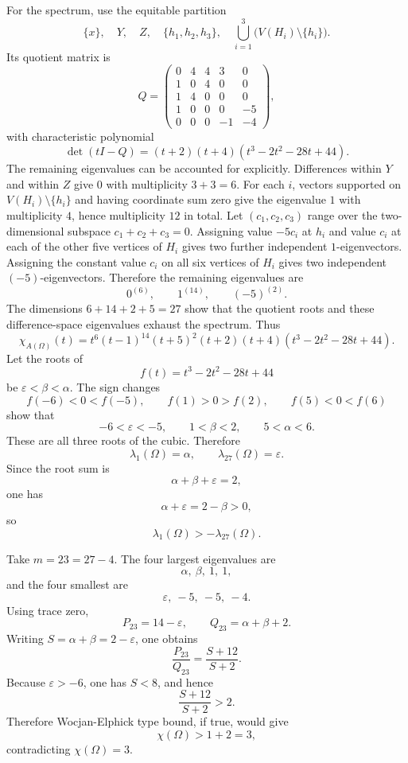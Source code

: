 \documentclass[12pt]{article}
\theoremstyle{plain}
\numberwithin{equation}{section}
\begin{document}
	For the spectrum, use the equitable partition
	\[
	\{x\},\quad Y,\quad Z,\quad \{h_1,h_2,h_3\},
	\quad \bigcup_{i=1}^3\bigl(V(H_i)\setminus\{h_i\}\bigr).
	\]
	Its quotient matrix is
	\[
	Q=
	\begin{pmatrix}
		0&4&4&3&0\\
		1&0&4&0&0\\
		1&4&0&0&0\\
		1&0&0&0&-5\\
		0&0&0&-1&-4
	\end{pmatrix},
	\]
	with characteristic polynomial
	\[
	\det(tI-Q)=(t+2)(t+4)(t^3-2t^2-28t+44).
	\]
	The remaining eigenvalues can be accounted for explicitly.  Differences within $Y$ and within $Z$ give $0$ with multiplicity $3+3=6$.  For each $i$, vectors supported on $V(H_i)\setminus\{h_i\}$ and having coordinate sum zero give the eigenvalue $1$ with multiplicity $4$, hence multiplicity $12$ in total.  Let $(c_1,c_2,c_3)$ range over the two-dimensional subspace $c_1+c_2+c_3=0$.  Assigning value $-5c_i$ at $h_i$ and value $c_i$ at each of the other five vertices of $H_i$ gives two further independent $1$-eigenvectors.  Assigning the constant value $c_i$ on all six vertices of $H_i$ gives two independent $(-5)$-eigenvectors.  Therefore the remaining eigenvalues are
	\[
	0^{(6)},\qquad 1^{(14)},\qquad (-5)^{(2)}.
	\]
	The dimensions $6+14+2+5=27$ show that the quotient roots and these difference-space eigenvalues exhaust the spectrum.  Thus
	\[
	\chi_{A(\Omega)}(t)=
	t^6(t-1)^{14}(t+5)^2(t+2)(t+4)
	(t^3-2t^2-28t+44).
	\]
	Let the roots of
	\[
	f(t)=t^3-2t^2-28t+44
	\]
	be $\varepsilon<\beta<\alpha$.  The sign changes
	\[
	f(-6)<0<f(-5),\qquad
	f(1)>0>f(2),\qquad
	f(5)<0<f(6)
	\]
	show that
	\[
	-6<\varepsilon<-5,
	\qquad 1<\beta<2,
	\qquad 5<\alpha<6.
	\]
	These are all three roots of the cubic.  Therefore
	\[
	\lambda_1(\Omega)=\alpha,
	\qquad
	\lambda_{27}(\Omega)=\varepsilon.
	\]
	Since the root sum is
	\[
	\alpha+\beta+\varepsilon=2,
	\]
	one has
	\[
	\alpha+\varepsilon=2-\beta>0,
	\]
	so
	\[
	\lambda_1(\Omega)>-\lambda_{27}(\Omega).
	\]
	
	Take $m=23=27-4$.  The four largest eigenvalues are
	\[
	\alpha,\ \beta,\ 1,\ 1,
	\]
	and the four smallest are
	\[
	\varepsilon,\ -5,\ -5,\ -4.
	\]
	Using trace zero,
	\[
	P_{23}=14-\varepsilon,
	\qquad
	Q_{23}=\alpha+\beta+2.
	\]
	Writing $S=\alpha+\beta=2-\varepsilon$, one obtains
	\[
	\frac{P_{23}}{Q_{23}}
	=\frac{S+12}{S+2}.
	\]
	Because $\varepsilon>-6$, one has $S<8$, and hence
	\[
	\frac{S+12}{S+2}>2.
	\]
	Therefore Wocjan-Elphick type bound, if true, would give
	\[
	\chi(\Omega)>
	1+2=3,
	\]
	contradicting $\chi(\Omega)=3$.
	
\end{document}
